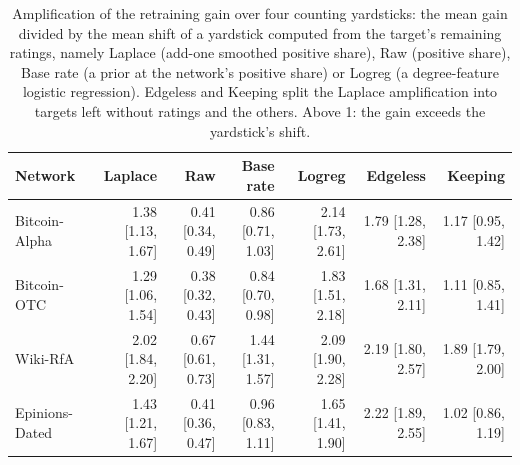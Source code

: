\begin{table}[!t]
\centering
\scriptsize
\setlength{\tabcolsep}{3pt}
\caption{Amplification of the retraining gain over four counting yardsticks: the mean gain divided by the mean shift of a yardstick computed from the target's remaining ratings, namely Laplace (add-one smoothed positive share), Raw (positive share), Base rate (a prior at the network's positive share) or Logreg (a degree-feature logistic regression). Edgeless and Keeping split the Laplace amplification into targets left without ratings and the others. Above 1: the gain exceeds the yardstick's shift.}
\label{tab:s_s_yardsticks}
\begin{tabular}{@{}lrrrrrr@{}}
\toprule
\textbf{Network} & \textbf{Laplace} & \textbf{Raw} & \textbf{Base rate} & \textbf{Logreg} & \textbf{Edgeless} & \textbf{Keeping} \\
\midrule
Bitcoin-Alpha & 1.38 [1.13, 1.67] & 0.41 [0.34, 0.49] & 0.86 [0.71, 1.03] & 2.14 [1.73, 2.61] & 1.79 [1.28, 2.38] & 1.17 [0.95, 1.42] \\
Bitcoin-OTC & 1.29 [1.06, 1.54] & 0.38 [0.32, 0.43] & 0.84 [0.70, 0.98] & 1.83 [1.51, 2.18] & 1.68 [1.31, 2.11] & 1.11 [0.85, 1.41] \\
Wiki-RfA & 2.02 [1.84, 2.20] & 0.67 [0.61, 0.73] & 1.44 [1.31, 1.57] & 2.09 [1.90, 2.28] & 2.19 [1.80, 2.57] & 1.89 [1.79, 2.00] \\
Epinions-Dated & 1.43 [1.21, 1.67] & 0.41 [0.36, 0.47] & 0.96 [0.83, 1.11] & 1.65 [1.41, 1.90] & 2.22 [1.89, 2.55] & 1.02 [0.86, 1.19] \\
\bottomrule
\end{tabular}
\end{table}
